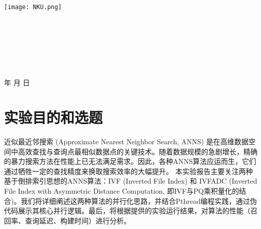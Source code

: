 \documentclass[a4paper]{article}
\begin{document}
	\renewcommand{\contentsname}{目\ 录}
	\renewcommand{\appendixname}{附录}
	\renewcommand{\appendixpagename}{附录}
	\renewcommand{\refname}{参考文献} 
	\renewcommand{\figurename}{图}
	\renewcommand{\tablename}{表}
	\renewcommand{\today}{\number\year 年 \number\month 月 \number\day 日}
	
	\begin{titlepage}
		\begin{center}
			\texttt{[image: NKU.png]}\\[1cm] %
			\vspace{20mm}
			\textbf{\huge\textbf{}}\\[0.5cm] %
			\textbf{\huge{}}\\[2.3cm] %
			\textbf{\Huge\textbf{}}\\[2cm] %
			
			
			\vspace{\fill}
			
			\centering
			\textsc{\LARGE {}}\\[0.5cm] %
			\textsc{\LARGE {}}\\[0.5cm] %
			\textsc{\LARGE {}}\\[0.5cm] %
			
			\vfill
			{\Large \today}
		\end{center}
	\end{titlepage}
	
	\renewcommand {\thefigure}{\thesection{}.\arabic{figure}}
	\renewcommand{\figurename}{图}
	\renewcommand{\contentsname}{目录}  
	
	
	\clearpage
	\tableofcontents
	\newpage
	
	\section{实验目的和选题} %
	近似最近邻搜索 (Approximate Nearest Neighbor Search, ANNS) 是在高维数据空间中高效查找与查询点最相似数据点的关键技术。随着数据规模的急剧增长，精确的暴力搜索方法在性能上已无法满足需求。因此，各种ANNS算法应运而生，它们通过牺牲一定的查找精度来换取搜索效率的大幅提升。
	本实验报告主要关注两种基于倒排索引思想的ANNS算法：IVF (Inverted File Index) 和 IVFADC (Inverted File Index with Asymmetric Distance Computation, 即IVF与PQ乘积量化的结合)。我们将详细阐述这两种算法的并行化思路，并结合Pthread编程实践，通过伪代码展示其核心并行逻辑。最后，将根据提供的实验运行结果，对算法的性能（召回率、查询延迟、构建时间）进行分析。
	
\end{document}
